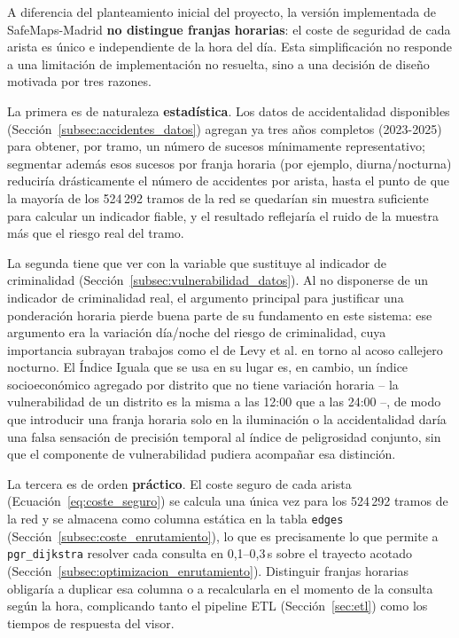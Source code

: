 A diferencia del planteamiento inicial del proyecto, la versión implementada de SafeMaps-Madrid \textbf{no distingue franjas horarias}: el coste de seguridad de cada arista es único e independiente de la hora del día. Esta simplificación no responde a una limitación de implementación no resuelta, sino a una decisión de diseño motivada por tres razones.

La primera es de naturaleza \textbf{estadística}. Los datos de accidentalidad disponibles (Sección~\ref{subsec:accidentes_datos}) agregan ya tres años completos (2023-2025) para obtener, por tramo, un número de sucesos mínimamente representativo; segmentar además esos sucesos por franja horaria (por ejemplo, diurna/nocturna) reduciría drásticamente el número de accidentes por arista, hasta el punto de que la mayoría de los 524\,292 tramos de la red se quedarían sin muestra suficiente para calcular un indicador fiable, y el resultado reflejaría el ruido de la muestra más que el riesgo real del tramo.

La segunda tiene que ver con la variable que sustituye al indicador de criminalidad (Sección~\ref{subsec:vulnerabilidad_datos}). Al no disponerse de un indicador de criminalidad real, el argumento principal para justificar una ponderación horaria pierde buena parte de su fundamento en este sistema: ese argumento era la variación día/noche del riesgo de criminalidad, cuya importancia subrayan trabajos como el de Levy et al. \cite{levy2020} en torno al acoso callejero nocturno. El Índice Iguala que se usa en su lugar es, en cambio, un índice socioeconómico agregado por distrito que no tiene variación horaria -- la vulnerabilidad de un distrito es la misma a las 12:00 que a las 24:00 --, de modo que introducir una franja horaria solo en la iluminación o la accidentalidad daría una falsa sensación de precisión temporal al índice de peligrosidad conjunto, sin que el componente de vulnerabilidad pudiera acompañar esa distinción.

La tercera es de orden \textbf{práctico}. El coste seguro de cada arista (Ecuación~\ref{eq:coste_seguro}) se calcula una única vez para los 524\,292 tramos de la red y se almacena como columna estática en la tabla \texttt{edges} (Sección~\ref{subsec:coste_enrutamiento}), lo que es precisamente lo que permite a \texttt{pgr\_dijkstra} resolver cada consulta en 0,1--0,3\,s sobre el trayecto acotado (Sección~\ref{subsec:optimizacion_enrutamiento}). Distinguir franjas horarias obligaría a duplicar esa columna o a recalcularla en el momento de la consulta según la hora, complicando tanto el pipeline ETL (Sección~\ref{sec:etl}) como los tiempos de respuesta del visor.

